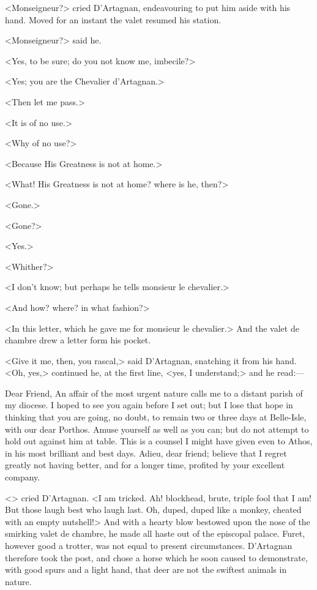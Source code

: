 <Monseigneur?> cried D'Artagnan, endeavouring to put him aside with his hand. Moved for an instant the valet resumed his station.

<Monseigneur?> said he.

<Yes, to be sure; do you not know me, imbecile?>

<Yes; you are the Chevalier d'Artagnan.>

<Then let me pass.>

<It is of no use.>

<Why of no use?>

<Because His Greatness is not at home.>

<What! His Greatness is not at home? where is he, then?>

<Gone.>

<Gone?>

<Yes.>

<Whither?>

<I don't know; but perhaps he tells monsieur le chevalier.>

<And how? where? in what fashion?>

<In this letter, which he gave me for monsieur le chevalier.> And the valet de chambre drew a letter form his pocket.

<Give it me, then, you rascal,> said D'Artagnan, snatching it from his hand. <Oh, yes,> continued he, at the first line, <yes, I understand;> and he read:—

\begin{mail}{}{Dear Friend,}
	An affair of the most urgent nature calls me to a distant parish of my diocese. I hoped to see you again before I set out; but I lose that hope in thinking that you are going, no doubt, to remain two or three days at Belle-Isle, with our dear Porthos. Amuse yourself as well as you can; but do not attempt to hold out against him at table. This is a counsel I might have given even to Athos, in his most brilliant and best days. Adieu, dear friend; believe that I regret greatly not having better, and for a longer time, profited by your excellent company.
	\end{mail}

<> cried D'Artagnan. <I am tricked. Ah! blockhead, brute, triple fool that I am! But those laugh best who laugh last. Oh, duped, duped like a monkey, cheated with an empty nutshell!> And with a hearty blow bestowed upon the nose of the smirking valet de chambre, he made all haste out of the episcopal palace. Furet, however good a trotter, was not equal to present circumstances. D'Artagnan therefore took the post, and chose a horse which he soon caused to demonstrate, with good spurs and a light hand, that deer are not the swiftest animals in nature. 